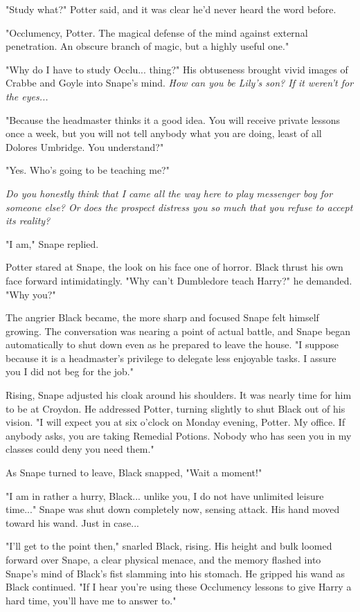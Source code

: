 "Study what?" Potter said, and it was clear he'd never heard the word before.

"Occlumency, Potter. The magical defense of the mind against external penetration. An obscure branch of magic, but a highly useful one."

"Why do I have to study Occlu... thing?" His obtuseness brought vivid images of Crabbe and Goyle into Snape's mind. \emph{How can you be Lily's son? If it weren't for the eyes...}

"Because the headmaster thinks it a good idea. You will receive private lessons once a week, but you will not tell anybody what you are doing, least of all Dolores Umbridge. You understand?"

"Yes. Who's going to be teaching me?"

\emph{Do you honestly think that I came all the way here to play messenger boy for someone else? Or does the prospect distress you so much that you refuse to accept its reality?}

"I am," Snape replied.

Potter stared at Snape, the look on his face one of horror. Black thrust his own face forward intimidatingly. "Why can't Dumbledore teach Harry?" he demanded. "Why you?"

The angrier Black became, the more sharp and focused Snape felt himself growing. The conversation was nearing a point of actual battle, and Snape began automatically to shut down even as he prepared to leave the house. "I suppose because it is a headmaster's privilege to delegate less enjoyable tasks. I assure you I did not beg for the job."

Rising, Snape adjusted his cloak around his shoulders. It was nearly time for him to be at Croydon. He addressed Potter, turning slightly to shut Black out of his vision. "I will expect you at six o'clock on Monday evening, Potter. My office. If anybody asks, you are taking Remedial Potions. Nobody who has seen you in my classes could deny you need them."

As Snape turned to leave, Black snapped, "Wait a moment!"

"I am in rather a hurry, Black... unlike you, I do not have unlimited leisure time..." Snape was shut down completely now, sensing attack. His hand moved toward his wand. Just in case...

"I'll get to the point then," snarled Black, rising. His height and bulk loomed forward over Snape, a clear physical menace, and the memory flashed into Snape's mind of Black's fist slamming into his stomach. He gripped his wand as Black continued. "If I hear you're using these Occlumency lessons to give Harry a hard time, you'll have me to answer to."

